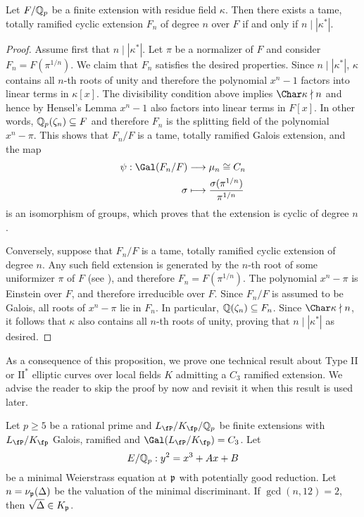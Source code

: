 \begin{prop}\label{prop_totally_ramified}
    Let $F/\mathbb{Q}_p$ be a finite extension with residue field $\kappa$. Then there exists a tame, totally ramified cyclic extension $F_n$ of degree $n$ over $F$ if and only if $n\mid|\kappa^*|$.
\end{prop}

\begin{proof}
    Assume first that $n\mid|\kappa^*|$. Let $\pi$ be a normalizer of $F$ and consider $F_n=F(\pi^{1/n})$. We claim that $F_n$ satisfies the desired properties. Since $n\mid|\kappa^*|$, $\kappa$ contains all $n$-th roots of unity and therefore the polynomial $x^n-1$ factors into linear terms in $\kappa[x]$. The divisibility condition above implies $\Char\kappa\nmid n$ and hence by Hensel's Lemma $x^n-1$ also factors into linear terms in $F[x]$. In other words, $\mathbb{Q}_p(\zeta_n)\subseteq F$ and therefore $F_n$ is the splitting field of the polynomial $x^n-\pi$. This shows that $F_n/F$ is a tame, totally ramified Galois extension, and the map 
    \begin{align*}
        \psi: \Gal(F_n/F)&\longrightarrow \mu_n\cong C_n\\
        \sigma &\longmapsto \frac{\sigma(\pi^{1/n})}{\pi^{1/n}}
    \end{align*}
    is an isomorphism of groups, which proves that the extension is cyclic of degree $n$.

    Conversely, suppose that $F_n/F$ is a tame, totally ramified cyclic extension of degree $n$. Any such field extension is generated by the $n$-th root of some uniformizer $\pi$ of $F$ (see \cite[Theorem 11.10]{Sun1}), and therefore $F_n=F(\pi^{1/n})$. The polynomial $x^n-\pi$ is Einstein over $F$, and therefore irreducible over $F$. Since $F_n/F$ is assumed to be Galois, all roots of $x^n-\pi$ lie in $F_n$. In particular, $\mathbb{Q}(\zeta_n)\subseteq F_n$. Since $\Char\kappa\nmid n$, it follows that $\kappa$ also contains all $n$-th roots of unity, proving that $n\mid|\kappa^*|$ as desired. 
\end{proof}

As a consequence of this proposition, we prove one technical result about Type II or $\mathrm{II}^*$ elliptic curves over local fields $K$ admitting a $C_3$ ramified extension. We advise the reader to skip the proof by now and revisit it when this result is used later.

\begin{lemma}\label{lem_nottwo}
    Let $p\geq 5$ be a rational prime and $L_\fP/K_\fp/\QQ_p$ be finite extensions with $L_\fP/K_\fp$ Galois, ramified and $\Gal(L_\fP/K_\fp)=C_3$. Let $$E/\mathbb{Q}_p:y^2=x^3+Ax+B$$ be a minimal Weierstrass equation at $\mathfrak{p}$ with potentially good reduction. Let $n=\nu_{\mathfrak{p}}(\Delta)$ be the valuation of the minimal discriminant. If $\gcd(n,12)=2$, then $\sqrt{\Delta}\in K_{\mathfrak{p}}$.
\end{lemma}

